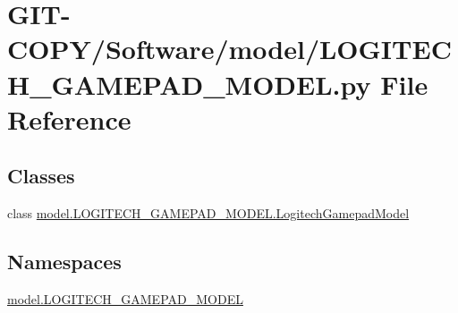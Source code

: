 \hypertarget{GIT-COPY_2Software_2model_2LOGITECH__GAMEPAD__MODEL_8py}{}\section{G\+I\+T-\/\+C\+O\+P\+Y/\+Software/model/\+L\+O\+G\+I\+T\+E\+C\+H\+\_\+\+G\+A\+M\+E\+P\+A\+D\+\_\+\+M\+O\+D\+E\+L.py File Reference}
\label{GIT-COPY_2Software_2model_2LOGITECH__GAMEPAD__MODEL_8py}
\subsection*{Classes}
\begin{DoxyCompactItemize}
\item 
class \hyperlink{classmodel_1_1LOGITECH__GAMEPAD__MODEL_1_1LogitechGamepadModel}{model.\+L\+O\+G\+I\+T\+E\+C\+H\+\_\+\+G\+A\+M\+E\+P\+A\+D\+\_\+\+M\+O\+D\+E\+L.\+Logitech\+Gamepad\+Model}
\end{DoxyCompactItemize}
\subsection*{Namespaces}
\begin{DoxyCompactItemize}
\item 
 \hyperlink{namespacemodel_1_1LOGITECH__GAMEPAD__MODEL}{model.\+L\+O\+G\+I\+T\+E\+C\+H\+\_\+\+G\+A\+M\+E\+P\+A\+D\+\_\+\+M\+O\+D\+E\+L}
\end{DoxyCompactItemize}
